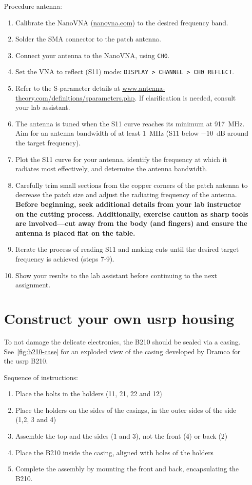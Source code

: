 Procedure antenna:
\begin{enumerate}
    \item Calibrate the NanoVNA (\url{nanovna.com}) to the desired frequency band.
    \item Solder the SMA connector to the patch antenna.
    \item  Connect your antenna to the NanoVNA, using \texttt{CH0}.
    \item Set the VNA to reflect (S11) mode: \texttt{DISPLAY > CHANNEL > CH0 REFLECT}.
    \item Refer to the S-parameter details at \url{www.antenna-theory.com/definitions/sparameters.php}. If clarification is needed, consult your lab assistant.
    \item The antenna is tuned when the S11 curve reaches its minimum at \SI{917}{\mega\hertz}. Aim for an antenna bandwidth of at least \SI{1}{\mega\hertz} (S11 below \SI{-10}{dB} around the target frequency).
\item Plot the S11 curve for your antenna, identify the frequency at which it radiates most effectively, and determine the antenna bandwidth.
\item Carefully trim small sections from the copper corners of the patch antenna to decrease the patch size and adjust the radiating frequency of the antenna. \textbf{Before beginning, seek additional details from your lab instructor on the cutting process. Additionally, exercise caution as sharp tools are involved—cut away from the body (and fingers) and ensure the antenna is placed flat on the table.}
\item Iterate the process of reading S11 and making cuts until the desired target frequency is achieved (steps 7-9).
\item Show your results to the lab assistant before continuing to the next assignment.
\end{enumerate}


\section{Construct your own \gls{usrp} housing}
To not damage the delicate electronics, the B210 should be sealed via a casing. See~\cref{fig:b210-case} for an exploded view of the casing developed by Dramco for the \gls{usrp} B210. 

Sequence of instructions:
\begin{enumerate}
    \item Place the bolts in the holders (11, 21, 22 and 12)
    \item Place the holders on the sides of the casings, in the outer sides of the side (1,2, 3 and 4)
    \item Assemble the top and the sides (1 and 3), not the front (4) or back (2)
    \item Place the B210 inside the casing, aligned with holes of the holders
    \item Complete the assembly by mounting the front and back, encapsulating the B210.
\end{enumerate}

